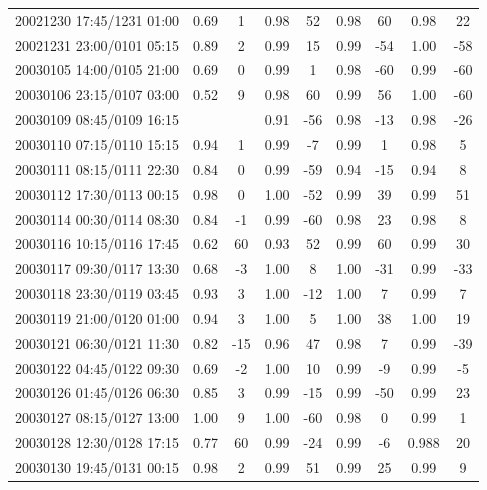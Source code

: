 \documentclass[linenumbers,draft]{agujournal}
\begin{document}
\begin{center}
\begin{longtable}{c||cc|cc|cc|cc}
20021230 17:45/1231 01:00 & 0.69 & 1 & 0.98 & 52 & 0.98 & 60 & 0.98 & 22 \\
20021231 23:00/0101 05:15 & 0.89 & 2 & 0.99 & 15 & 0.99 & -54 & 1.00 & -58 \\
20030105 14:00/0105 21:00 & 0.69 & 0 & 0.99 & 1 & 0.98 & -60 & 0.99 & -60 \\
20030106 23:15/0107 03:00 & 0.52 & 9 & 0.98 & 60 & 0.99 & 56 & 1.00 & -60 \\
20030109 08:45/0109 16:15 &  &  & 0.91 & -56 & 0.98 & -13 & 0.98 & -26 \\
20030110 07:15/0110 15:15 & 0.94 & 1 & 0.99 & -7 & 0.99 & 1 & 0.98 & 5 \\
20030111 08:15/0111 22:30 & 0.84 & 0 & 0.99 & -59 & 0.94 & -15 & 0.94 & 8 \\
20030112 17:30/0113 00:15 & 0.98 & 0 & 1.00 & -52 & 0.99 & 39 & 0.99 & 51 \\
20030114 00:30/0114 08:30 & 0.84 & -1 & 0.99 & -60 & 0.98 & 23 & 0.98 & 8 \\
20030116 10:15/0116 17:45 & 0.62 & 60 & 0.93 & 52 & 0.99 & 60 & 0.99 & 30 \\
20030117 09:30/0117 13:30 & 0.68 & -3 & 1.00 & 8 & 1.00 & -31 & 0.99 & -33 \\
20030118 23:30/0119 03:45 & 0.93 & 3 & 1.00 & -12 & 1.00 & 7 & 0.99 & 7 \\
20030119 21:00/0120 01:00 & 0.94 & 3 & 1.00 & 5 & 1.00 & 38 & 1.00 & 19 \\
20030121 06:30/0121 11:30 & 0.82 & -15 & 0.96 & 47 & 0.98 & 7 & 0.99 & -39 \\
20030122 04:45/0122 09:30 & 0.69 & -2 & 1.00 & 10 & 0.99 & -9 & 0.99 & -5 \\
20030126 01:45/0126 06:30 & 0.85 & 3 & 0.99 & -15 & 0.99 & -50 & 0.99 & 23 \\
20030127 08:15/0127 13:00 & 1.00 & 9 & 1.00 & -60 & 0.98 & 0 & 0.99 & 1 \\
20030128 12:30/0128 17:15 & 0.77 & 60 & 0.99 & -24 & 0.99 & -6 & 0.988 & 20 \\
20030130 19:45/0131 00:15 & 0.98 & 2 & 0.99 & 51 & 0.99 & 25 & 0.99 & 9 \\
\end{longtable}
\end{center}

\pagebreak
\end{document}
